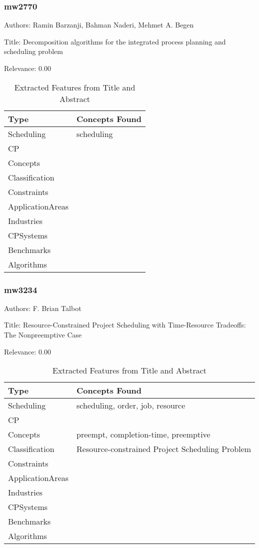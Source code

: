 \subsubsection{mw2770}
\label{mw:mw2770}

Authors: Ramin Barzanji, Bahman Naderi, Mehmet A. Begen

Title: Decomposition algorithms for the integrated process planning and scheduling problem

Relevance:  0.00

{\scriptsize
\begin{longtable}{p{2cm}p{20cm}}
\caption{Extracted Features from Title and Abstract}\\ \toprule
Type & Concepts Found\\ \midrule
\endhead
\bottomrule
\endfoot
Scheduling & scheduling\\ 
CP & \\ 
Concepts & \\ 
Classification & \\ 
Constraints & \\ 
ApplicationAreas & \\ 
Industries & \\ 
CPSystems & \\ 
Benchmarks & \\ 
Algorithms & \\ 
\end{longtable}
}



\subsubsection{mw3234}
\label{mw:mw3234}

Authors: F. Brian Talbot

Title: Resource-Constrained Project Scheduling with Time-Resource Tradeoffs: The Nonpreemptive Case

Relevance:  0.00

{\scriptsize
\begin{longtable}{p{2cm}p{20cm}}
\caption{Extracted Features from Title and Abstract}\\ \toprule
Type & Concepts Found\\ \midrule
\endhead
\bottomrule
\endfoot
Scheduling & scheduling, order, job, resource\\ 
CP & \\ 
Concepts & preempt, completion-time, preemptive\\ 
Classification & Resource-constrained Project Scheduling Problem\\ 
Constraints & \\ 
ApplicationAreas & \\ 
Industries & \\ 
CPSystems & \\ 
Benchmarks & \\ 
Algorithms & \\ 
\end{longtable}
}

